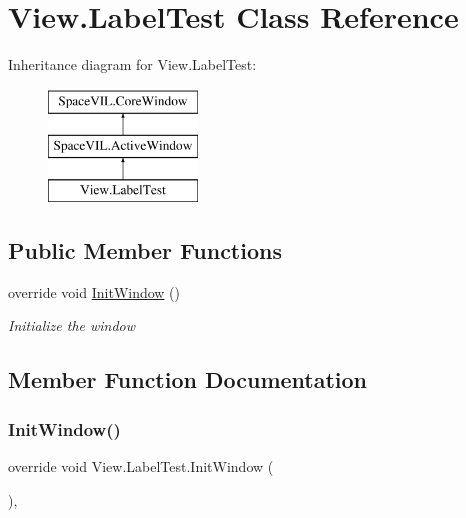\hypertarget{class_view_1_1_label_test}{}\section{View.\+Label\+Test Class Reference}
\label{class_view_1_1_label_test}
Inheritance diagram for View.\+Label\+Test\+:\begin{figure}[H]
\begin{center}
\leavevmode
\includegraphics[height=3.000000cm]{class_view_1_1_label_test}
\end{center}
\end{figure}
\subsection*{Public Member Functions}
\begin{DoxyCompactItemize}
\item 
override void \mbox{\hyperlink{class_view_1_1_label_test_afc1aadc0634c9a71494e371204bfdf08}{Init\+Window}} ()
\begin{DoxyCompactList}\small\item\em Initialize the window \end{DoxyCompactList}\end{DoxyCompactItemize}


\subsection{Member Function Documentation}
\mbox{\label{class_view_1_1_label_test_afc1aadc0634c9a71494e371204bfdf08}} 
\subsubsection{\texorpdfstring{Init\+Window()}{InitWindow()}}
{\footnotesize\ttfamily override void View.\+Label\+Test.\+Init\+Window (\begin{DoxyParamCaption}{ }\end{DoxyParamCaption})\hspace{0.3cm}{\ttfamily [inline]}, {\ttfamily [virtual]}}



